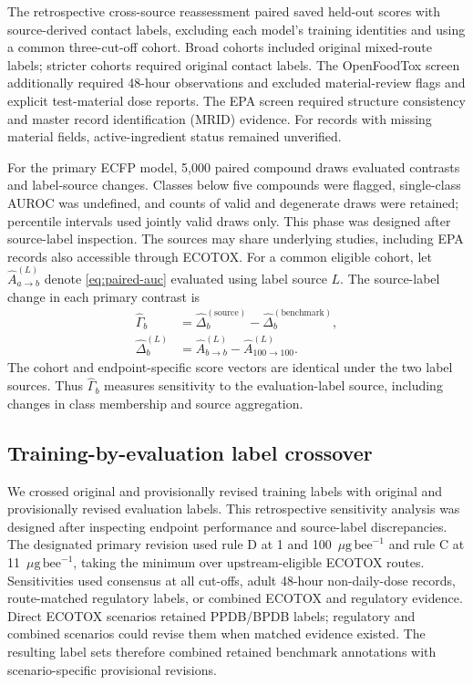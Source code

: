 \documentclass{ieeeaccess}
\newcommand{\ugbee}{\ensuremath{\mu\mathrm{g\,bee}^{-1}}\xspace}
\begin{document}
The retrospective cross-source reassessment paired saved held-out scores with source-derived contact labels, excluding each model's training identities and using a common three-cut-off cohort. Broad cohorts included original mixed-route labels; stricter cohorts required original contact labels. The OpenFoodTox screen additionally required 48-hour observations and excluded material-review flags and explicit test-material dose reports. The EPA screen required structure consistency and master record identification (MRID) evidence. For records with missing material fields, active-ingredient status remained unverified.

For the primary ECFP model, 5,000 paired compound draws evaluated contrasts and label-source changes. Classes below five compounds were flagged, single-class AUROC was undefined, and counts of valid and degenerate draws were retained; percentile intervals used jointly valid draws only. This phase was designed after source-label inspection. The sources may share underlying studies, including EPA records also accessible through ECOTOX\cite{Farruggia2022}. For a common eligible cohort, let \(\widehat A^{(L)}_{a\to b}\) denote \eqref{eq:paired-auc} evaluated using label source \(L\). The source-label change in each primary contrast is
\begin{equation}
\begin{aligned}
\widehat\Gamma_b&=\widehat\Delta_b^{(\mathrm{source})}
-\widehat\Delta_b^{(\mathrm{benchmark})},\\
\widehat\Delta_b^{(L)}&=\widehat A^{(L)}_{b\to b}
-\widehat A^{(L)}_{100\to100}.
\end{aligned}
\label{eq:source-shift}
\end{equation}
The cohort and endpoint-specific score vectors are identical under the two label sources. Thus \(\widehat\Gamma_b\) measures sensitivity to the evaluation-label source, including changes in class membership and source aggregation.

\subsection{Training-by-evaluation label crossover}
We crossed original and provisionally revised training labels with original and provisionally revised evaluation labels. This retrospective sensitivity analysis was designed after inspecting endpoint performance and source-label discrepancies. The designated primary revision used rule D at 1 and 100~\ugbee and rule C at 11~\ugbee, taking the minimum over upstream-eligible ECOTOX routes. Sensitivities used consensus at all cut-offs, adult 48-hour non-daily-dose records, route-matched regulatory labels, or combined ECOTOX and regulatory evidence. Direct ECOTOX scenarios retained PPDB/BPDB labels; regulatory and combined scenarios could revise them when matched evidence existed. The resulting label sets therefore combined retained benchmark annotations with scenario-specific provisional revisions.
\end{document}

